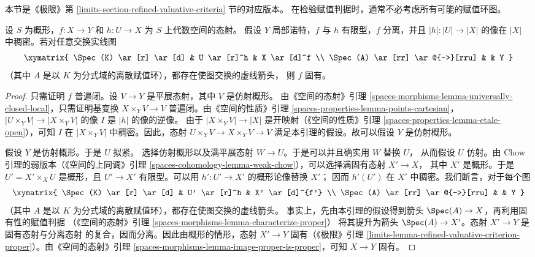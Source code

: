 \noindent
本节是《极限》第 \ref{limits-section-refined-valuative-criteria} 节的对应版本。
在检验赋值判据时，通常不必考虑所有可能的赋值环图。

\begin{lemma}
\label{lemma-refined-valuative-criterion-proper}
设 $S$ 为概形，$f : X \to Y$ 和 $h : U \to X$ 为 $S$ 上代数空间的态射。
假设 $Y$ 局部诺特，$f$ 与 $h$ 有限型，$f$ 分离，并且
$|h| : |U| \to |X|$ 的像在 $|X|$ 中稠密。若对任意交换实线图
$$
\xymatrix{
\Spec(K) \ar[r] \ar[d] & U \ar[r]^h & X \ar[d]^f \\
\Spec(A) \ar[rr] \ar@{-->}[rru] & & Y
}
$$
（其中 $A$ 是以 $K$ 为分式域的离散赋值环），都存在使图交换的虚线箭头，
则 $f$ 固有。
\end{lemma}

\begin{proof}
只需证明 $f$ 普遍闭。设 $V \to Y$ 是平展态射，其中 $V$ 是仿射概形。
由《空间的态射》引理
\ref{spaces-morphisms-lemma-universally-closed-local}，只需证明基变换
$X \times_Y V \to V$ 普遍闭。由《空间的性质》引理
\ref{spaces-properties-lemma-points-cartesian}，
$|U \times_Y V| \to |X \times_Y V|$ 的像 $I$ 是 $|h|$ 的像的逆像。
由于 $|X \times_Y V| \to |X|$ 是开映射（《空间的性质》引理
\ref{spaces-properties-lemma-etale-open}），可知 $I$ 在
$|X \times_Y V|$ 中稠密。因此，态射
$U \times_Y V \to X \times_Y V \to V$ 满足本引理的假设。故可以假设
$Y$ 是仿射概形。

\medskip\noindent
假设 $Y$ 是仿射概形。于是 $U$ 拟紧。%
选择仿射概形以及满平展态射 $W \to U$。于是可以并且确实用 $W$ 替换 $U$，
从而假设 $U$ 仿射。由 Chow 引理的弱版本（《空间的上同调》引理
\ref{spaces-cohomology-lemma-weak-chow}），可以选择满固有态射 $X' \to X$，
其中 $X'$ 是概形。于是 $U' = X' \times_X U$ 是概形，且
$U' \to X'$ 有限型。可以用 $h' : U' \to X'$ 的概形论像替换 $X'$；
因而 $h'(U')$ 在 $X'$ 中稠密。我们断言，对于每个图
$$
\xymatrix{
\Spec(K) \ar[r] \ar[d] & U' \ar[r]^h & X' \ar[d]^{f'} \\
\Spec(A) \ar[rr] \ar@{-->}[rru] & & Y
}
$$
（其中 $A$ 是以 $K$ 为分式域的离散赋值环），都存在使图交换的虚线箭头。
事实上，先由本引理的假设得到箭头 $\Spec(A) \to X$，再利用固有性的赋值判据
（《空间的态射》引理 \ref{spaces-morphisms-lemma-characterize-proper}）
将其提升为箭头 $\Spec(A) \to X'$。态射 $X' \to Y$ 是固有态射与分离态射
的复合，因而分离。因此由概形的情形，态射 $X' \to Y$ 固有（《极限》引理
\ref{limits-lemma-refined-valuative-criterion-proper}）。由《空间的态射》引理
\ref{spaces-morphisms-lemma-image-proper-is-proper}，可知 $X \to Y$ 固有。
\end{proof}

